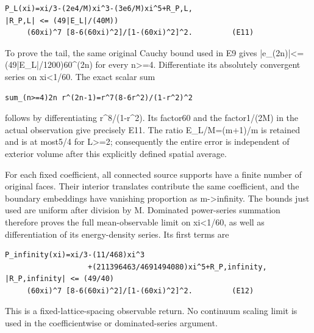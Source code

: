 \documentclass[11pt,a4paper]{article}
\renewcommand{\[}{\begingroup\small\originaldisplaystart}
\renewcommand{\]}{\originaldisplayend\endgroup}
\begin{document}
\begin{verbatim}
P_L(xi)=xi/3-(2e4/M)xi^3-(3e6/M)xi^5+R_P,L,
|R_P,L| <= (49|E_L|/(40M))
     (60xi)^7 [8-6(60xi)^2]/[1-(60xi)^2]^2.         (E11)
\end{verbatim}

To prove the tail, the same original Cauchy bound used in E9 gives
{\ttfamily |\allowbreak{}e\allowbreak{}\_\allowbreak{}(\allowbreak{}2\allowbreak{}n\allowbreak{})\allowbreak{}|\allowbreak{}\textless{}\allowbreak{}=\allowbreak{}(\allowbreak{}4\allowbreak{}9\allowbreak{}|\allowbreak{}E\allowbreak{}\_\allowbreak{}L\allowbreak{}|\allowbreak{}/\allowbreak{}1\allowbreak{}2\allowbreak{}0\allowbreak{}0\allowbreak{})\allowbreak{}6\allowbreak{}0\allowbreak{}\textasciicircum{}\allowbreak{}(\allowbreak{}2\allowbreak{}n\allowbreak{})\allowbreak{}}
for every n\textgreater=4. Differentiate its absolutely convergent
series on \textbar xi\textbar\textless1/60. The exact scalar sum

\begin{verbatim}
sum_(n>=4)2n r^(2n-1)=r^7(8-6r^2)/(1-r^2)^2
\end{verbatim}

follows by differentiating r\^{}8/(1-r\^{}2). Its factor60 and the
factor1/(2M) in the actual observation give precisely E11. The ratio
\textbar E\_L\textbar/M=(m+1)/m is retained and is at most5/4 for
L\textgreater=2; consequently the entire error is independent of
exterior volume after this explicitly defined spatial average.

For each fixed coefficient, all connected source supports have a finite
number of original faces. Their interior translates contribute the same
coefficient, and the boundary embeddings have vanishing proportion as
m-\textgreater infinity. The bounds just used are uniform after division
by M. Dominated power-series summation therefore proves the full
mean-observable limit on \textbar xi\textbar\textless1/60, as well as
differentiation of its energy-density series. Its first terms are

\begin{verbatim}
P_infinity(xi)=xi/3-(11/468)xi^3
                   +(211396463/4691494080)xi^5+R_P,infinity,
|R_P,infinity| <= (49/40)
     (60xi)^7 [8-6(60xi)^2]/[1-(60xi)^2]^2.         (E12)
\end{verbatim}

This is a fixed-lattice-spacing observable return. No continuum scaling
limit is used in the coefficientwise or dominated-series argument.
\end{document}
